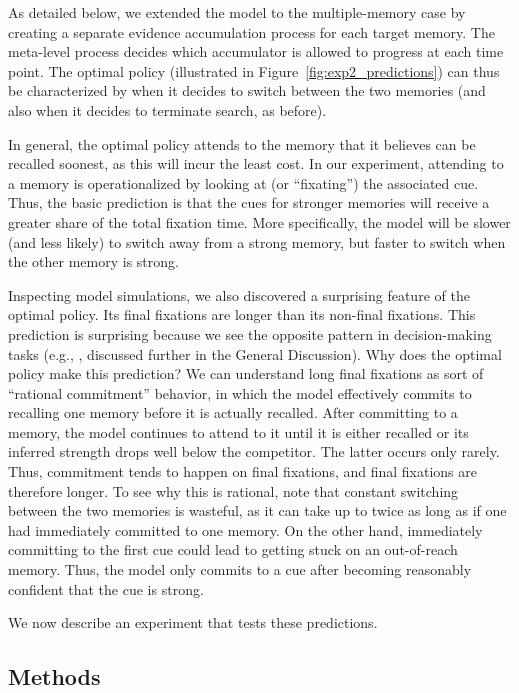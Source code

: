 As detailed below, we extended the model to the multiple-memory case by creating a separate evidence accumulation process for each target memory. The meta-level process decides which accumulator is allowed to progress at each time point. The optimal policy (illustrated in Figure~\ref{fig:exp2_predictions}) can thus be characterized by when it decides to switch between the two memories (and also when it decides to terminate search, as before). 

In general, the optimal policy attends to the memory that it believes can be recalled soonest, as this will incur the least cost. In our experiment, attending to a memory is operationalized by looking at (or ``fixating'') the associated cue. Thus, the basic prediction is that the cues for stronger memories will receive a greater share of the total fixation time. More specifically, the model will be slower (and less likely) to switch away from a strong memory, but faster to switch when the other memory is strong.

Inspecting model simulations, we also discovered a surprising feature of the optimal policy. Its final fixations are longer than its non-final fixations. This prediction is surprising because we see the opposite pattern in decision-making tasks (e.g., \citealp{krajbich2010visual}, discussed further in the General Discussion). Why does the optimal policy make this prediction? We can understand long final fixations as sort of ``rational commitment'' behavior, in which the model effectively commits to recalling one memory before it is actually recalled. After committing to a memory, the model continues to attend to it until it is either recalled or its inferred strength drops well below the competitor. The latter occurs only rarely. Thus, commitment tends to happen on final fixations, and final fixations are therefore longer. To see why this is rational, note that constant switching between the two memories is wasteful, as it can take up to twice as long as if one had immediately committed to one memory. On the other hand, immediately committing to the first cue could lead to getting stuck on an out-of-reach memory. Thus, the model only commits to a cue after becoming reasonably confident that the cue is strong.

We now describe an experiment that tests these predictions.

\subsection{Methods}

